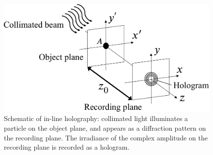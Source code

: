 \begin{figure}[b]
    \centering
    \includegraphics[width=0.8\linewidth]{./Figure/2_Theory/inline_holography.pdf}
    \caption{Schematic of in-line holography: collimated light illuminates a particle on the object plane, and appears as a diffraction pattern  on the recording plane. The irradiance of the complex amplitude on the recording plane is recorded as a hologram.}
    \label{fig:in-lineHolography}
\end{figure}

